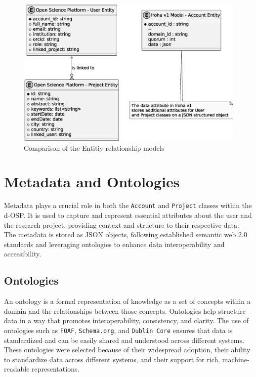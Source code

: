 \documentclass[final]{rc-book-2.14}
\begin{document}
\begin{figure}[htbp]
    \centering
    \includegraphics[scale=0.5]{fig/comparing_er_models.eps}
    \caption{Comparison of the Entitiy-relationship models}
    \label{fig:comparing_er_models}
\end{figure}

\section{Metadata and Ontologies}
\label{chp:proposed_model:sec:ontologies}

Metadata plays a crucial role in both the \texttt{Account} and \texttt{Project} classes within the d-OSP. It is used to capture and represent essential attributes about the user and the research project, providing context and structure to their respective data. The metadata is stored as JSON objects, following established semantic web 2.0 standards and leveraging ontologies to enhance data interoperability and accessibility.

\subsection{Ontologies}

An ontology is a formal representation of knowledge as a set of concepts within a domain and the relationships between those concepts. Ontologies help structure data in a way that promotes interoperability, consistency, and clarity. The use of ontologies such as \texttt{FOAF}, \texttt{Schema.org}, and \texttt{Dublin Core} ensures that data is standardized and can be easily shared and understood across different systems. These ontologies were selected because of their widespread adoption, their ability to standardize data across different systems, and their support for rich, machine-readable representations.
\end{document}
